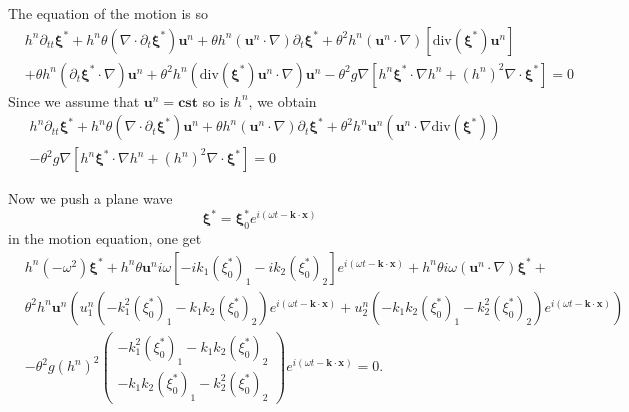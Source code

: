 \documentclass[a4paper, 11pt]{report}
\begin{document}
The equation of the motion is so
\begin{equation*}
\begin{split}
&h^n\partial_{tt}\boldsymbol{\xi}^*+h^n\theta(\nabla \cdot \partial_t \boldsymbol{\xi}^*)\boldsymbol{u}^n+\theta h^n\left(\boldsymbol{u}^n\cdot \nabla \right)\partial_t \boldsymbol{\xi}^*+\theta^2h^n\left(\boldsymbol{u}^n\cdot \nabla \right)\left[\text{div}(\boldsymbol{\xi}^*)\boldsymbol{u}^n\right]\\
&+\theta h^n\left(\partial_t \boldsymbol{\xi}^*\cdot \nabla\right)\boldsymbol{u}^n+\theta^2h^n\left(\text{div}( \boldsymbol{\xi}^*)\boldsymbol{u}^n\cdot \nabla \right)\boldsymbol{u}^n-\theta^2g\nabla \left[h^n\boldsymbol{\xi}^*\cdot \nabla h^n+(h^n)^2\nabla \cdot \boldsymbol{\xi}^*\right]=0
\end{split}
\end{equation*}
Since we assume that $\boldsymbol{u}^n=\boldsymbol{cst}$ so is $h^n$, we obtain
\begin{equation*}
\begin{split}
&h^n\partial_{tt}\boldsymbol{\xi}^*+h^n\theta(\nabla \cdot \partial_t \boldsymbol{\xi}^*)\boldsymbol{u}^n+\theta h^n\left(\boldsymbol{u}^n\cdot \nabla \right)\partial_t \boldsymbol{\xi}^*+\theta^2h^n\boldsymbol{u}^n \left(\boldsymbol{u}^n\cdot \nabla \text{div}(\boldsymbol{\xi}^*)\right) \\
&-\theta^2g\nabla \left[h^n\boldsymbol{\xi}^*\cdot \nabla h^n+(h^n)^2\nabla \cdot \boldsymbol{\xi}^*\right]=0
\end{split}
\end{equation*}

Now we push a plane wave 
\begin{equation*}
\boldsymbol{\xi}^*=\boldsymbol{\xi}_0^*e^{i(\omega t-\boldsymbol{k}\cdot \boldsymbol{x})}
\end{equation*}
in the motion equation, one get
\begin{equation*}
\begin{split}
&h^n(-\omega^2)\boldsymbol{\xi}^*+h^n\theta\boldsymbol{u}^ni\omega\left[-ik_1(\xi_0^*)_1-ik_2(\xi_0^*)_2\right]e^{i(\omega t-\boldsymbol{k}\cdot \boldsymbol{x})}+h^n\theta i\omega (\boldsymbol{u}^n\cdot \nabla)\boldsymbol{\xi}^*+\\
&\theta^2 h^n\boldsymbol{u}^n\left(u_1^n\left(-k_1^2(\xi_0^*)_1-k_1k_2(\xi_0^*)_2\right)e^{i(\omega t-\boldsymbol{k}\cdot \boldsymbol{x})}+u_2^n\left(-k_1k_2(\xi_0^*)_1-k_2^2(\xi_0^*)_2\right)e^{i(\omega t-\boldsymbol{k}\cdot \boldsymbol{x})}\right)\\
&-\theta^2g(h^n)^2\begin{pmatrix}-k_1^2(\xi_0^*)_1-k_1k_2(\xi_0^*)_2\\ -k_1k_2(\xi_0^*)_1-k_2^2(\xi_0^*)_2\end{pmatrix}e^{i(\omega t-\boldsymbol{k}\cdot \boldsymbol{x})}=0.
\end{split}
\end{equation*}
\end{document}
